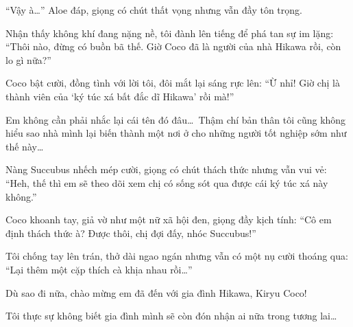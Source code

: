 \documentclass[../main.tex]{subfiles}
\begin{document}
``Vậy à\dots'' Aloe đáp, giọng có chút thất vọng nhưng vẫn đầy tôn trọng.

Nhận thấy không khí đang nặng nề, tôi đành lên tiếng để phá tan sự im lặng: ``Thôi nào, đừng có buồn bã thế. Giờ Coco đã là người của nhà Hikawa rồi, còn lo gì nữa?''

Coco bật cười, đồng tình với lời tôi, đôi mắt lại sáng rực lên: ``Ừ nhỉ! Giờ chị là thành viên của `ký túc xá bất đắc dĩ Hikawa' rồi mà!''

Em không cần phải nhắc lại cái tên đó đâu\dots\ Thậm chí bản thân tôi cũng không hiểu sao nhà mình lại biến thành một nơi ở cho những người tốt nghiệp sớm như thế này\dots

Nàng Succubus nhếch mép cười, giọng có chút thách thức nhưng vẫn vui vẻ: ``Heh, thế thì em sẽ theo dõi xem chị có sống sót qua được cái ký túc xá này không.''

Coco khoanh tay, giả vờ như một nữ xã hội đen, giọng đầy kịch tính: ``Cô em định thách thức à? Được thôi, chị đợi đấy, nhóc Succubus!''

Tôi chống tay lên trán, thở dài ngao ngán nhưng vẫn có một nụ cười thoáng qua: ``Lại thêm một cặp thích cà khịa nhau rồi\dots''

Dù sao đi nữa, chào mừng em đã đến với gia đình Hikawa, Kiryu Coco!

Tôi thực sự không biết gia đình mình sẽ còn đón nhận ai nữa trong tương lai\dots
\end{document}
